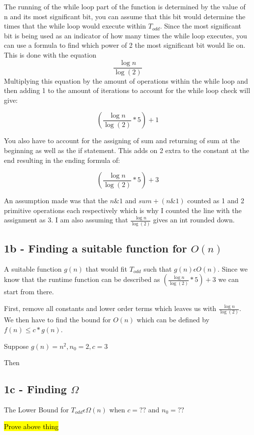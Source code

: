 \documentclass[oneside, a4paper]{article}
\begin{document}
The running of the while loop part of the function is determined by the value of n and its most significant bit, you can assume that this bit would determine the times that the while loop would execute within $T_{odd}$. Since the most significant bit is being used as an indicator of how many times the while loop executes, you can use a formula to find which power of 2 the most significant bit would lie on. This is done with the equation 
$$\frac{\log{n}}{\log(2)}$$ 
Multiplying this equation by the amount of operations within the while loop and then adding 1 to the amount of iterations to account for the while loop check will give:

$$(\frac{\log{n}}{\log(2)} * 5) + 1$$

You also have to account for the assigning of sum and returning of sum at the beginning as well as the if statement. This adds on 2 extra to the constant at the end resulting in the ending formula of:

$$(\frac{\log{n}}{\log(2)} * 5) + 3$$

An assumption made was that the $n \& 1$ and $sum + (n \& 1)$ counted as 1 and 2 primitive operations each respectively which is why I counted the line with the assignment as 3. I am also assuming that $\frac{\log{n}}{\log(2)}$ gives an int rounded down.

\subsection*{1b - Finding a suitable function for $O(n)$}

A suitable function $g(n)$ that would fit $T_{odd}$ such that $g(n) \epsilon O(n)$. Since we know that the runtime function can be described as $(\frac{\log{n}}{\log(2)} * 5) + 3$ we can start from there.

First, remove all constants and lower order terms which leaves us with $\frac{\log{n}}{\log(2)}$. We then have to find the bound for $O(n)$ which can be defined by $f(n) \leq c * g(n)$. 

Suppose $g(n) = n^2, n_0 = 2, c = 3$

Then
 

\subsection*{1c - Finding $\Omega$}

The Lower Bound for $T_{odd} \epsilon \Omega(n)$ when $c = ??$ and $n_0 = ??$ 

\hl{Prove above thing}
\end{document}

